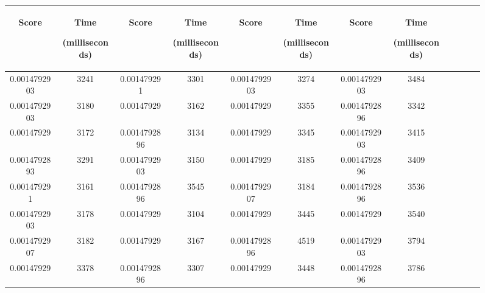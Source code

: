 \begin{figure}[h]
  \centering
  \begin{tabular}{|c|c|c|c|c|c|c|c|c|c|c|c|} 
  \midrule
 \begin{sideways}Score\end{sideways}& \begin{sideways}Time\end{sideways} \begin{sideways} (milliseconds)\end{sideways}& \begin{sideways}Score\end{sideways}& \begin{sideways}Time\end{sideways}  \begin{sideways}(milliseconds)\end{sideways}& \begin{sideways}Score\end{sideways}& \begin{sideways}Time\end{sideways}  \begin{sideways}(milliseconds)\end{sideways}& \begin{sideways}Score\end{sideways}& \begin{sideways}Time\end{sideways}  \begin{sideways} (milliseconds)\end{sideways}\\
\midrule
0.0014792903&3241&0.001479291&3301&0.0014792903&3274&0.0014792903&3484\\
\midrule
0.0014792903&3180&0.00147929&3162&0.00147929&3355&0.0014792896&3342\\
\midrule
0.00147929&3172&0.0014792896&3134&0.00147929&3345&0.0014792903&3415\\
\midrule
0.0014792893&3291&0.0014792903&3150&0.00147929&3185&0.0014792896&3409\\
\midrule
0.001479291&3161&0.0014792896&3545&0.0014792907&3184&0.0014792896&3536\\
\midrule
0.0014792903&3178&0.00147929&3104&0.00147929&3445&0.00147929&3540\\
\midrule
0.0014792907&3182&0.00147929&3167&0.0014792896&4519&0.0014792903&3794\\
\midrule
0.00147929&3378&0.0014792896&3307&0.00147929&3448&0.0014792896&3786\\

\end{tabular}
\end{figure}
